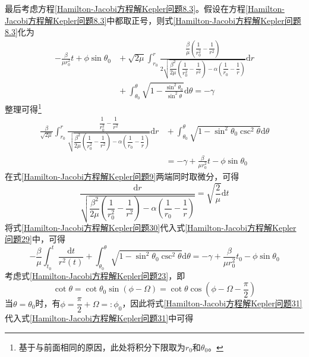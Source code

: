 最后考虑方程\eqref{Hamilton-Jacobi方程解Kepler问题8.3}。假设在方程\eqref{Hamilton-Jacobi方程解Kepler问题8.3}中都取正号，则式\eqref{Hamilton-Jacobi方程解Kepler问题8.3}化为
\begin{align*}
	-\frac{\beta}{\mu r_0^2}t + \phi\sin\theta_0 & {}+\sqrt{2\mu}\int_{r_0}^r \frac{\dfrac{\beta}{\mu}\left(\dfrac{1}{r_0^2}-\dfrac{1}{r^2}\right)}{2\sqrt{\dfrac{\beta^2}{2\mu}\left(\dfrac{1}{r_0^2}-\dfrac{1}{r^2}\right)-\alpha\left(\dfrac{1}{r_0}-\dfrac{1}{r}\right)}}\mathrm{d}r \\
	& {} + \int_{\theta_0}^\theta \sqrt{1-\frac{\sin^2\theta_0}{\sin^2\theta}}\mathrm{d}\theta = -\gamma
\end{align*}
整理可得\footnote{基于与前面相同的原因，此处将积分下限取为$r_0$和$\theta_0$。}
\begin{align}
	\frac{\beta}{\sqrt{2\mu}}\int_{r_0}^r \frac{\dfrac{1}{r_0^2}-\dfrac{1}{r^2}}{\sqrt{\dfrac{\beta^2}{2\mu}\left(\dfrac{1}{r_0^2}-\dfrac{1}{r^2}\right)-\alpha\left(\dfrac{1}{r_0}-\dfrac{1}{r}\right)}} \mathrm{d}r & {}+ \int_{\theta_0}^\theta \sqrt{1-\sin^2\theta_0\csc^2\theta} \mathrm{d}\theta \nonumber \\
	& = -\gamma + \frac{\beta}{\mu r_0^2}t - \phi\sin\theta_0
	\label{Hamilton-Jacobi方程解Kepler问题29}
\end{align}
在式\eqref{Hamilton-Jacobi方程解Kepler问题9}两端同时取微分，可得
\begin{equation}
	\frac{\mathrm{d}r}{\sqrt{\dfrac{\beta^2}{2\mu}\left(\dfrac{1}{r_0^2}-\dfrac{1}{r^2}\right)-\alpha\left(\dfrac{1}{r_0}-\dfrac{1}{r}\right)}} = \sqrt{\frac{2}{\mu}}\mathrm{d}t
	\label{Hamilton-Jacobi方程解Kepler问题30}
\end{equation}
将式\eqref{Hamilton-Jacobi方程解Kepler问题30}代入式\eqref{Hamilton-Jacobi方程解Kepler问题29}中，可得
\begin{equation}
	-\frac{\beta}{\mu}\int_{t_0}^t \frac{\mathrm{d}t}{r^2(t)} + \int_{\theta_0}^\theta \sqrt{1-\sin^2\theta_0\csc^2\theta} \mathrm{d}\theta = -\gamma + \frac{\beta}{\mu r_0^2}t_0-\phi\sin\theta_0
	\label{Hamilton-Jacobi方程解Kepler问题31}
\end{equation}
考虑式\eqref{Hamilton-Jacobi方程解Kepler问题23}，即
\begin{equation}
	\cot\theta = \cot\theta_0\sin(\phi-\varOmega) = \cot\theta\cos\left(\phi-\varOmega-\dfrac{\pi}{2}\right)
	\label{Hamilton-Jacobi方程解Kepler问题32}
\end{equation}
当$\theta=\theta_0$时，有$\phi=\dfrac{\pi}{2}+\varOmega=:\phi_0$，因此将式\eqref{Hamilton-Jacobi方程解Kepler问题31}代入式\eqref{Hamilton-Jacobi方程解Kepler问题31}中可得
